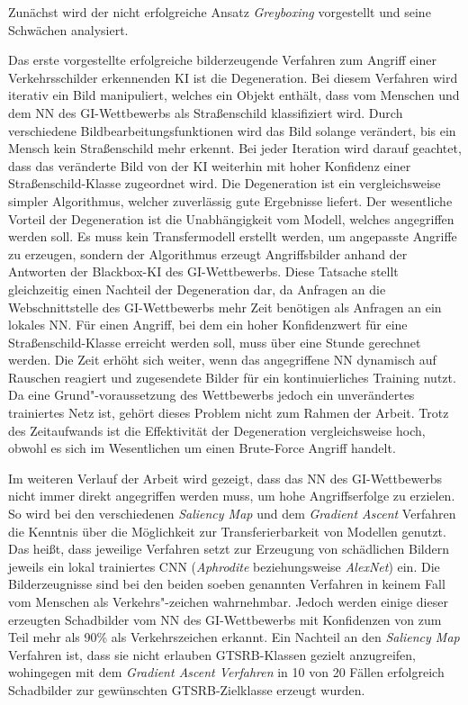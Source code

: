 Zunächst wird der nicht erfolgreiche Ansatz \textit{Greyboxing} vorgestellt und seine Schwächen analysiert.

Das erste vorgestellte erfolgreiche bilderzeugende Verfahren zum Angriff einer Verkehrsschilder erkennenden \ac{KI} ist die Degeneration.
Bei diesem Verfahren wird iterativ ein Bild manipuliert, welches ein Objekt enthält, dass vom Menschen und dem \ac{NN} des \ac{GI}-Wettbewerbs als Straßenschild klassifiziert wird. 
Durch verschiedene Bildbearbeitungsfunktionen wird das Bild solange verändert, bis ein Mensch kein Straßenschild mehr erkennt. 
Bei jeder Iteration wird darauf geachtet, dass das veränderte Bild von der \ac{KI} weiterhin mit hoher Konfidenz einer Straßenschild-Klasse zugeordnet wird. 
Die Degeneration ist ein vergleichsweise simpler Algorithmus, welcher zuverlässig gute Ergebnisse liefert. 
Der wesentliche Vorteil der Degeneration ist die Unabhängigkeit vom Modell, welches angegriffen werden soll. 
Es muss kein Transfermodell erstellt werden, um angepasste Angriffe zu erzeugen, sondern der Algorithmus erzeugt Angriffsbilder anhand der Antworten der Blackbox-\ac{KI} des \ac{GI}-Wettbewerbs. 
Diese Tatsache stellt gleichzeitig einen Nachteil der Degeneration dar, da Anfragen an die Webschnittstelle des \ac{GI}-Wettbewerbs mehr Zeit benötigen als Anfragen an ein lokales \ac{NN}. 
Für einen Angriff, bei dem ein hoher Konfidenzwert für eine Straßenschild-Klasse erreicht werden soll, muss über eine Stunde gerechnet werden. 
Die Zeit erhöht sich weiter, wenn das angegriffene \ac{NN} dynamisch auf Rauschen reagiert und zugesendete Bilder für ein kontinuierliches Training nutzt. 
Da eine Grund"-voraussetzung des Wettbewerbs jedoch ein unverändertes trainiertes Netz ist, gehört dieses Problem nicht zum Rahmen der Arbeit. 
Trotz des Zeitaufwands ist die Effektivität der Degeneration vergleichsweise hoch, obwohl es sich im Wesentlichen um einen Brute-Force Angriff handelt. 

Im weiteren Verlauf der Arbeit wird gezeigt, dass das \ac{NN} des \ac{GI}-Wettbewerbs nicht immer direkt angegriffen werden muss, um hohe Angriffserfolge zu erzielen. 
So wird bei den verschiedenen \textit{Saliency Map} und dem \textit{Gradient Ascent} Verfahren die Kenntnis über die Möglichkeit zur Transferierbarkeit von Modellen genutzt. 
Das heißt, dass jeweilige Verfahren setzt zur Erzeugung von schädlichen Bildern jeweils ein lokal trainiertes \ac{CNN} (\textit{Aphrodite} beziehungsweise \textit{AlexNet}) ein. 
Die Bilderzeugnisse sind bei den beiden soeben genannten Verfahren in keinem Fall vom Menschen als Verkehrs"-zeichen wahrnehmbar. 
Jedoch werden einige dieser erzeugten Schadbilder vom \ac{NN} des \ac{GI}-Wettbewerbs mit Konfidenzen von zum Teil mehr als 90\% als Verkehrszeichen erkannt. 
Ein Nachteil an den \textit{Saliency Map} Verfahren ist, dass sie nicht erlauben \ac{GTSRB}-Klassen gezielt anzugreifen, wohingegen mit dem \textit{Gradient Ascent Verfahren} in 10 von 20 Fällen erfolgreich Schadbilder zur gewünschten \ac{GTSRB}-Zielklasse erzeugt wurden.


